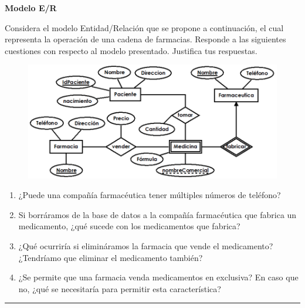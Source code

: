 \documentclass{exam}
\begin{document}
\begin{questions}
	\question \textbf{Modelo E/R}
	
	Considera el modelo Entidad/Relación que se propone a continuación, el cual representa la operación de una cadena de farmacias. Responde a las siguientes cuestiones con respecto al modelo presentado. Justifica tus respuestas.
	
	\begin{figure}[h!]
		\includegraphics[scale=1]{pregunta_3.png}
		\centering
	\end{figure}
	
	\begin{enumerate}[label=\alph*.]
		\item ¿Puede una compañía farmacéutica tener múltiples números de teléfono?
		\item Si borráramos de la base de datos a la compañía farmacéutica que fabrica un medicamento, ¿qué sucede con los medicamentos que fabrica?
		\item ¿Qué ocurriría si elimináramos la farmacia que vende el medicamento? ¿Tendríamo que eliminar el medicamento también?
		\item ¿Se permite que una farmacia venda medicamentos en exclusiva? En caso que no, ¿qué se necesitaría para permitir esta característica?
	\end{enumerate}
	
\end{questions}

\noindent
\rule[2ex]{\textwidth}{2pt}
\newpage
\end{document}
